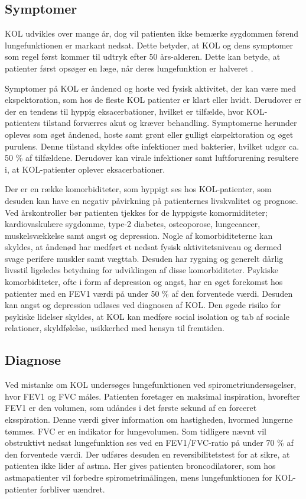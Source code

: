\subsection{Symptomer}
KOL udvikles over mange år, dog vil patienten ikke bemærke sygdommen førend lungefunktionen er markant nedsat. Dette betyder, at KOL og dens symptomer som regel først kommer til udtryk efter 50 års-alderen\cite{Lange2015}. Dette kan betyde, at patienter først opsøger en læge, når deres lungefunktion er halveret \cite{dsam2016}.

Symptomer på KOL er åndenød og hoste ved fysisk aktivitet, der kan være med ekspektoration, som hos de fleste KOL patienter er klart eller hvidt.\cite{Basisbogen2016} Derudover er der en tendens til hyppig eksacerbationer, hvilket er tilfælde, hvor KOL-patienters tilstand forværres akut og kræver behandling. 
Symptomerne herunder opleves som øget åndenød, hoste samt grønt eller gulligt ekspektoration og øget purulens. Denne tilstand skyldes ofte infektioner med bakterier, hvilket udgør ca. 50 \% af tilfældene. Derudover kan virale infektioner samt luftforurening resultere i, at KOL-patienter oplever eksacerbationer.\cite{Basisbogen2016, dsam2016} 

Der er en række komorbiditeter, som hyppigt ses hos KOL-patienter, som desuden kan have en negativ påvirkning på patienternes livskvalitet og prognose. Ved årskontroller bør patienten tjekkes for de hyppigste komormiditeter; kardiovaskulære sygdomme, type-2 diabetes, osteoporose, lungecancer, muskelsvækkelse samt angst og depression.
Nogle af komorbiditeterne kan skyldes, at åndenød har medført et nedsat fysisk aktivitetsniveau og dermed svage perifere muskler samt vægttab. Desuden har rygning og generelt dårlig livsstil ligeledes betydning for udviklingen af disse komorbiditeter. \cite{dsam2016, McCarthy2015}
Psykiske komorbiditeter, ofte i form af depression og angst, har en øget forekomst hos patienter med en FEV1 værdi på under 50 \% af den forventede værdi. Desuden kan angst og depression udløses ved diagnosen af KOL. Den øgede risiko for psykiske lidelser skyldes, at KOL kan medføre social isolation og tab af sociale relationer, skyldfølelse, usikkerhed med hensyn til fremtiden. \cite{dsam2016}


\subsection{Diagnose}
Ved mistanke om KOL undersøges lungefunktionen ved spirometriundersøgelser, hvor FEV1 og FVC måles. Patienten foretager en maksimal inspiration, hvorefter FEV1 er den volumen, som udåndes i det første sekund af en forceret eksspiration. Denne værdi giver information om hastigheden, hvormed lungerne tømmes. FVC er en indikator for lungevolumen. Som tidligere nævnt vil obstruktivt nedsat lungefunktion ses ved en FEV1/FVC-ratio på under 70 \% af den forventede værdi. Der udføres desuden en reversibilitetstest for at sikre, at patienten ikke lider af astma. Her gives patienten broncodilatorer, som hos astmapatienter vil forbedre spirometrimålingen, mens lungefunktionen for KOL-patienter forbliver uændret.\cite{Basisbogen2016, Sundhed2013} 

